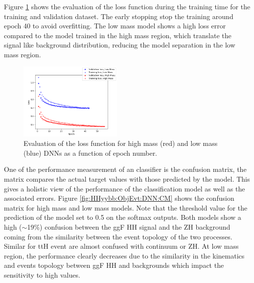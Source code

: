 Figure \ref{fig:HHyybb:ObjEvt:DNN:Loss} shows the evaluation of the loss function during the training time for the training and validation dataset. The early stopping stop the training around epoch 40 to avoid overfitting. The low mass model shows a high loss error compared to the model trained in the high mass region, which translate the signal like background distribution, reducing the model separation in the low mass region.
\begin{figure}[htbp]
    \centering
    \includegraphics[width=0.45\textwidth]{Ch5/Img/Loss_DNN.png}
    \begin{tcolorbox}[colback=black!5!white,colframe=white!75!black]
    \caption{Evaluation of the loss function for high mass (red) and low mass (blue) DNNs as a function of epoch number.}
    \label{fig:HHyybb:ObjEvt:DNN:Loss}
    \end{tcolorbox}
    
\end{figure}
One of the performance measurement of an classifier is the confusion matrix, the matrix compares the actual target values with those predicted by the model. This gives a holistic view of the performance of the classification model as well as the associated errors. Figure \ref{fig:HHyybb:ObjEvt:DNN:CM} shows the confusion matrix for high mass and low mass models. Note that the threshold value for the prediction of the model set to 0.5 on the softmax outputs. Both models show a high ($\sim$19\%) confusion between the ggF HH signal and the ZH background coming from the similarity between the event topology of the two processes. Similar for ttH event are almost confused with continuum or ZH. At low mass region, the performance clearly decreases due to the similarity in the kinematics and events topology between ggF HH and backgrounds which impact the sensitivity to high \kl values.

